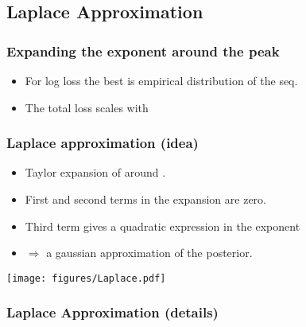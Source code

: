 \documentclass[handout]{beamer}
\begin{document}
\subsection{Laplace Approximation}
\begin{frame}
\frametitle{Expanding the exponent around the peak}

\begin{itemize}
\item
For log loss the best \R{$\theta$} is empirical distribution
of the seq.
\R{\[
	\btheta = {\#\{x^t=1;\;\; 1 \leq t \leq T \} \over T} 
\]}
\item
The total loss scales with 
\R{\[
\TEloss{\theta} =
 T \cdot (\btheta \ell(\theta,1) + (1-\btheta)\ell(\theta,0))
 \doteq T \cdot g(\btheta,\theta)
\]}
\end{itemize}
\pause
{}
\end{frame}

\begin{frame}
\frametitle{Laplace approximation (idea)}
\begin{itemize}
\item Taylor expansion of  around \R{$\theta=\btheta$}.
\item
First and second terms in the expansion are zero.
\item
Third term gives a quadratic expression in the exponent
\item
$\Rightarrow$ a gaussian approximation of the posterior.
\end{itemize}
\pause
\texttt{[image: figures/Laplace.pdf]}

\end{frame}

\begin{frame}
\frametitle{Laplace Approximation (details)}

\end{frame}
\end{document}
